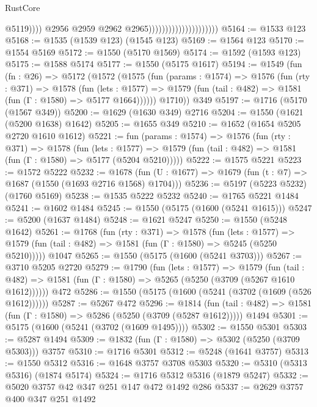 \begin{lexlean}{RustCore}
\begin{coremodule}
                                                      @5119))))
                                              @2956
                                              @2959
                                              @2962
                                              @2965)))))))))))))))))))))
@5164 := @1533 @123
@5168 := @1535 (@1539 @123) (@1545 @123)
@5169 := @1564 @123
@5170 := @1554 @5169
@5172 := @1550 (@5170 @1569)
@5174 := @1592 (@1593 @123)
@5175 := @1588 @5174
@5177 := @1550 (@5175 @1617)
@5194 := @1549
    (fun (fn : @26) =>
    @5172
      (@1572
        (@1575
          (fun (params : @1574) =>
          @1576
            (fun (rty : @371) =>
            @1578
              (fun (lets : @1577) =>
              @1579 (fun (tail : @482) => @1581 (fun (Γ : @1580) => @5177 @1664))))))
        @1710))
    @349
@5197 := @1716 (@5170 (@1567 @349))
@5200 := @1629 (@1630 @349) @2716
@5204 := @1550 (@1621 (@5200 @1638) @1642)
@5205 := @1655 @349
@5210 := @1652 (@1654 @5205 @2720 @1610 @1612)
@5221 := fun (params : @1574) =>
  @1576
    (fun (rty : @371) =>
    @1578
      (fun (lets : @1577) =>
      @1579 (fun (tail : @482) => @1581 (fun (Γ : @1580) => @5177 (@5204 @5210)))))
@5222 := @1575 @5221
@5223 := @1572 @5222
@5232 := @1678 (fun (U : @1677) => @1679 (fun (t : @7) => @1687 (@1550 (@1693 @2716 @1568) @1704)))
@5236 := @5197 (@5223 @5232) (@1760 @5169)
@5238 := @1535 @5222 @5232
@5240 := @1765 @5221 @1484
@5241 := @1602 @1484
@5245 := @1550 (@5175 (@1600 (@5241 @1615)))
@5247 := @5200 (@1637 @1484)
@5248 := @1621 @5247
@5250 := @1550 (@5248 @1642)
@5261 := @1768
    (fun (rty : @371) =>
    @1578
      (fun (lets : @1577) =>
      @1579 (fun (tail : @482) => @1581 (fun (Γ : @1580) => @5245 (@5250 @5210)))))
    @1047
@5265 := @1550 (@5175 (@1600 (@5241 @3703)))
@5267 := @3710 @5205 @2720
@5279 := @1790
    (fun (lets : @1577) =>
    @1579
      (fun (tail : @482) => @1581 (fun (Γ : @1580) => @5265 (@5250 (@3709 (@5267 @1610 @1612))))))
    @472
@5286 := @1550 (@5175 (@1600 (@5241 (@3702 (@1609 (@526 @1612))))))
@5287 := @5267 @472
@5296 := @1814
    (fun (tail : @482) => @1581 (fun (Γ : @1580) => @5286 (@5250 (@3709 (@5287 @1612)))))
    @1494
@5301 := @5175 (@1600 (@5241 (@3702 (@1609 @1495))))
@5302 := @1550 @5301
@5303 := @5287 @1494
@5309 := @1832 (fun (Γ : @1580) => @5302 (@5250 (@3709 @5303))) @3757
@5310 := @1716 @5301
@5312 := @5248 (@1641 @3757)
@5313 := @1550 @5312
@5316 := @1648 @3757 @3708 @5303
@5320 := @5310 (@5313 @5316) (@1874 @5174)
@5324 := @1716 @5312 @5316 (@1879 @5247)
@5332 := @5020 @3757 @42 @347 @251 @147 @472 @1492 @286
@5337 := @2629 @3757 @400 @347 @251 @1492

\end{coremodule}
\end{lexlean}
